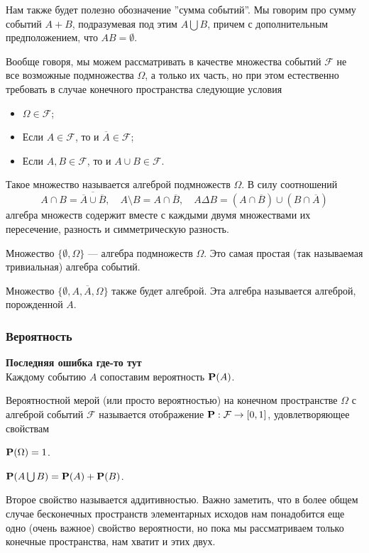 \documentclass[11 pt,russian]{article}
\begin{document}
Нам также будет полезно обозначение ''сумма событий''. Мы говорим про сумму событий $A+B$, подразумевая под этим $A\bigcup B$, причем с дополнительным предположением, что $AB= \emptyset$. 

Вообще говоря, мы можем рассматривать в качестве множества событий $\mathcal{F}$ не все возможные подмножества $\Omega$, а только их часть, но при этом естественно требовать в случае конечного пространства следующие условия 
\begin{itemize}
\item $\Omega\in\mathcal{F}$; 
\item Если $A\in \mathcal{F}$, то и $\overline{A}\in \mathcal{F}$;
\item Если $A,B\in \mathcal{F}$, то и $A\cup B\in \mathcal{F}$.
\end{itemize}
Такое множество называется алгеброй подмножеств $\Omega$. В силу соотношений
$$
A\cap B = \overline{\overline{A}\cup \overline{B}},\quad
A\setminus B = A\cap \overline{B},\quad
A\Delta B = (A\cap \overline{B})\cup (B\cap \overline{A})
$$
алгебра множеств содержит вместе с каждыми двумя множествами их пересечение, разность и симметрическую разность.
\begin{Exam}
Множество $\{\emptyset, \Omega\}$ --- алгебра подмножеств $\Omega$. Это самая простая (так называемая тривиальная) алгебра событий.

Множество $\{\emptyset, A, \overline{A},\Omega\}$ также будет алгеброй. Эта алгебра называется алгеброй, порожденной $A$. 
\end{Exam}
\subsubsection{Вероятность}
{\bf Последняя ошибка где-то тут\\ }
Каждому событию $A$ сопоставим вероятность ${\bf P}(A)$. 
\begin{Def}
Вероятностной мерой (или просто вероятностью) на конечном пространстве $\Omega$ с алгеброй событий $\mathcal{F}$ называется отображение ${\bf P}:\mathcal{F}\to [0,1]$, удовлетворяющее свойствам
\begin{enumerate*}
\item ${\bf P}(\Omega) = 1$.
\item ${\bf P}(A \bigcup B) = {\bf P}(A) + {\bf P}(B)$.
\end{enumerate*}
\end{Def}
Второе свойство называется аддитивностью. Важно заметить, что в более общем случае бесконечных пространств элементарных исходов нам понадобится еще одно (очень важное) свойство вероятности, но пока мы рассматриваем только конечные пространства, нам хватит и этих двух.
\end{document}
